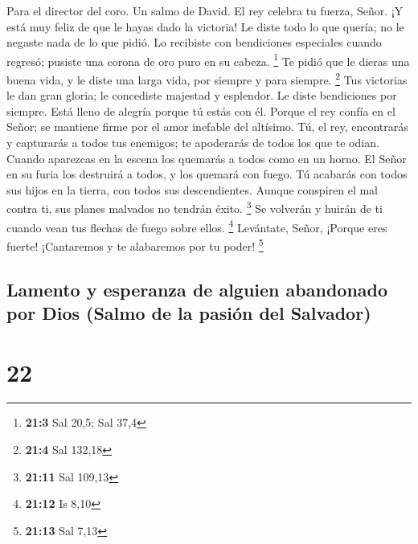 Para el director del coro. Un salmo de David.  El rey
celebra tu fuerza, Señor. ¡Y está muy feliz de que le hayas dado la
victoria!  Le diste todo lo que quería; no le negaste nada
de lo que pidió.  Lo recibiste con bendiciones especiales
cuando regresó; pusiste una corona de oro puro en su cabeza. \footnote{\textbf{21:3}
  Sal 20,5; Sal 37,4}  Te pidió que le dieras una buena
vida, y le diste una larga vida, por siempre y para siempre. \footnote{\textbf{21:4}
  Sal 132,18}  Tus victorias le dan gran gloria; le
concediste majestad y esplendor.  Le diste bendiciones por
siempre. Está lleno de alegría porque tú estás con él. 
Porque el rey confía en el Señor; se mantiene firme por el amor inefable
del altísimo.  Tú, el rey, encontrarás y capturarás a todos
tus enemigos; te apoderarás de todos los que te odian. 
Cuando aparezcas en la escena los quemarás a todos como en un horno. El
Señor en su furia los destruirá a todos, y los quemará con fuego.
 Tú acabarás con todos sus hijos en la tierra, con todos
sus descendientes.  Aunque conspiren el mal contra ti, sus
planes malvados no tendrán éxito. \footnote{\textbf{21:11} Sal 109,13}
 Se volverán y huirán de ti cuando vean tus flechas de
fuego sobre ellos. \footnote{\textbf{21:12} Is 8,10} 
Levántate, Señor, ¡Porque eres fuerte! ¡Cantaremos y te alabaremos por
tu poder! \footnote{\textbf{21:13} Sal 7,13}

\hypertarget{lamento-y-esperanza-de-alguien-abandonado-por-dios-salmo-de-la-pasiuxf3n-del-salvador}{%
\subsection{Lamento y esperanza de alguien abandonado por Dios (Salmo de
la pasión del
Salvador)}\label{lamento-y-esperanza-de-alguien-abandonado-por-dios-salmo-de-la-pasiuxf3n-del-salvador}}

\hypertarget{section-21}{%
\section{22}\label{section-21}}

